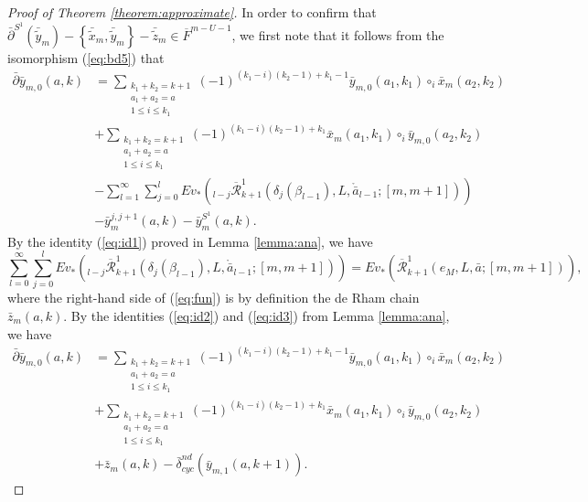 \documentclass[a4paper]{article}
\numberwithin{equation}{section}
\begin{document}
\begin{proof}[Proof of Theorem \ref{theorem:approximate}]
In order to confirm that $\bar{\partial}^{S^1}(\bar{\tilde{y}}_m)-\left\{\bar{\tilde{x}}_m,\bar{\tilde{y}}_m\right\}-\bar{\tilde{z}}_m\in\overline{F}^{m-U-1}$, we first note that it follows from the isomorphism (\ref{eq:bd5}) that
\begin{equation}\label{eq:ana}
\begin{split}
\bar{\partial}{\bar{y}}_{m,0}(a,k)&=\sum_{\substack{k_1+k_2=k+1\\a_1+a_2=a\\1\leq i\leq k_1}}(-1)^{(k_1-i)(k_2-1)+k_1-1}\bar{y}_{m,0}(a_1,k_1)\circ_i\bar{x}_m(a_2,k_2) \\
&+\sum_{\substack{k_1+k_2=k+1\\a_1+a_2=a\\1\leq i\leq k_1}}(-1)^{(k_1-i)(k_2-1)+k_1}\bar{x}_m(a_1,k_1)\circ_i\bar{y}_{m,0}(a_2,k_2) \\
&-\sum_{l=1}^\infty\sum_{j=0}^l\mathit{Ev}_\ast\left({}_{l-j}\overline{\mathcal{R}}_{k+1}^1\left(\delta_j(\beta_{l-1}),L,\ring{\bar{a}}_{l-1};[m,m+1]\right)\right) \\
&-\bar{y}_m^{j,j+1}(a,k)-\bar{y}_m^{S^1}(a,k).
\end{split}
\end{equation}
By the identity (\ref{eq:id1}) proved in Lemma \ref{lemma:ana}, we have
\begin{equation}\label{eq:fun}
\sum_{l=0}^\infty\sum_{j=0}^l\mathit{Ev}_\ast\left({}_{l-j}\overline{\mathcal{R}}_{k+1}^1\left(\delta_j(\beta_{l-1}),L,\ring{\bar{a}}_{l-1};[m,m+1]\right)\right)=\mathit{Ev}_\ast\left(\overline{\mathcal{R}}_{k+1}^1(e_M,L,\bar{a};[m,m+1])\right),
\end{equation}
where the right-hand side of (\ref{eq:fun}) is by definition the de Rham chain $\bar{z}_m(a,k)$. By the identities (\ref{eq:id2}) and (\ref{eq:id3}) from Lemma \ref{lemma:ana}, we have
\begin{equation}\label{eq:ana1}
\begin{split}
\bar{\partial}{\bar{y}}_{m,0}(a,k)&=\sum_{\substack{k_1+k_2=k+1\\a_1+a_2=a\\1\leq i\leq k_1}}(-1)^{(k_1-i)(k_2-1)+k_1-1}\bar{y}_{m,0}(a_1,k_1)\circ_i\bar{x}_m(a_2,k_2) \\
&+\sum_{\substack{k_1+k_2=k+1\\a_1+a_2=a\\1\leq i\leq k_1}}(-1)^{(k_1-i)(k_2-1)+k_1}\bar{x}_m(a_1,k_1)\circ_i\bar{y}_{m,0}(a_2,k_2) \\
&+\bar{z}_m(a,k)-\bar{\delta}_\mathit{cyc}^\mathit{nd}\left(\bar{y}_{m,1}(a,k+1)\right).

\end{split}
\end{equation}
\end{proof}
\end{document}

